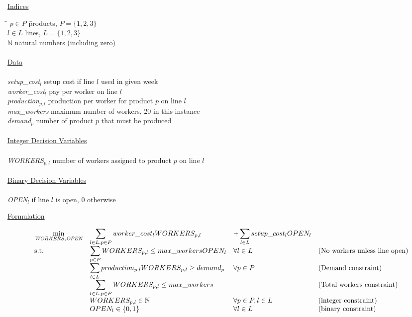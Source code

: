 \documentclass[10pt]{article}
\begin{document}
\noindent\underline{Indices}
\begin{tabbing}
\hspace{.5cm} \= $p\in P$ \hspace{2.5cm} \= products, $P=\{1,2,3\}$ \\
\> $l\in L$ \> lines, $L=\{1,2,3\}$\\
\> $\mathbb N$ \> natural numbers (including zero)\\

\\
\noindent\underline{Data}\\%
\\
\> {\it setup\_cost}$_{l}$ \> setup cost if line $l$ used in given week\\
\> {\it worker\_cost}$_{l}$ \> pay per worker on line $l$ \\
\> {\it production}$_{p,l}$ \> production per worker for product $p$ on line $l$ \\
\> {\it max\_workers} \> maximum number of workers, 20 in this instance \\
\> {\it demand}$_{p}$ \> number of product $p$ that must be produced \\
\\

\noindent\underline{Integer Decision Variables}\\%
\\
\> {\it WORKERS}$_{p,l}$ \> number of workers assigned to product $p$ on line $l$  \\
\\
\noindent\underline{Binary Decision Variables}\\%
\\
\> {\it OPEN}$_{l}$  if line $l$ is open, 0 otherwise  \\
\end{tabbing}


\noindent\underline{Formulation}

 \[
    \begin{array}{llll}
      \displaystyle\min_{ \tiny{\it WORKERS, OPEN}} & \displaystyle\sum_{l\in L,p\in P} worker\_cost_{l} WORKERS_{p,l} & + \displaystyle\sum_{l\in L} setup\_cost_l OPEN_l & \\
      \mbox{s.t.} & \displaystyle\sum_{p\in P} WORKERS_{p,l} \le max\_workers OPEN_l &  \forall l \in L & {\rm (No~workers~unless~line~open)}\\
& \displaystyle\sum_{l \in L} production_{p,l} WORKERS_{p,l} \ge demand_p &  \forall p \in P & {\rm (Demand~constraint)}\\
& \displaystyle\sum_{l \in L,p \in P} WORKERS_{p,l} \le max\_workers &  & {\rm (Total~workers~constraint)}\\
& WORKERS_{p,l} \in {\mathbb N} &\forall p\in P, l \in L  & {\rm (integer~constraint)}\\
& OPEN_{l} \in \{0,1\} & \forall l\in L & {\rm (binary~constraint)}\\
    \end{array}
    \]
\end{document}
